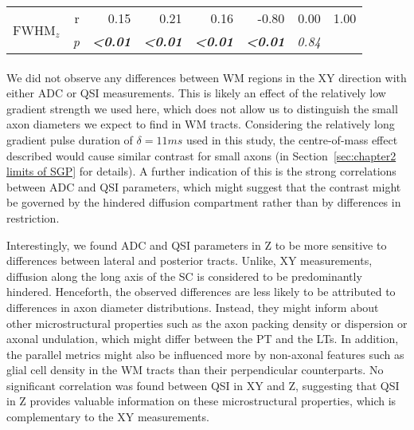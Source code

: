 \begin{table}[tb]
\begin{tableframe}
\begin{adjustbox}{width=0.9\textwidth,keepaspectratio}
\begin{minipage}{\textwidth}
\begin{tabular}{rrrrrrrr}
    \multicolumn{1}{c}{\multirow{2}[0]{*}{FWHM$_{z}$}} & r   & 0.15  & 0.21  & 0.16  & -0.80 & 0.00  & 1.00 \\
    \multicolumn{1}{c}{} & \textit{p} & \textbf{\textit{<0.01}} & \textbf{\textit{<0.01}} & \textbf{\textit{<0.01}} & \textbf{\textit{<0.01}} & \textit{0.84} & \textit{} \\
    \bottomrule
    \end{tabular}%
  	\end{minipage}
	\end{adjustbox}
\end{tableframe}
\end{table}


\paragraph{} We did not observe any differences between WM regions in the XY direction with either ADC or QSI measurements. This is likely an effect of the relatively low gradient strength we used here,  which does not allow us to distinguish the small axon diameters we expect to find in WM tracts. Considering the relatively long gradient pulse duration of $\delta=11ms$ used in this study, the centre-of-mass effect described would cause similar contrast for small axons (in Section~\ref{sec:chapter2 limits of SGP} for details). A further indication of this is the strong correlations between ADC and QSI parameters, which might suggest that the contrast might be governed by the hindered diffusion compartment rather than by differences in restriction.

Interestingly, we found ADC and QSI parameters in Z to be more sensitive to differences between lateral and posterior tracts. Unlike, XY measurements, diffusion along the long axis of the SC is considered to be predominantly hindered. Henceforth, the observed differences are less likely to be attributed to differences in axon diameter distributions. Instead, they might inform about other microstructural properties such as the axon packing density or dispersion\citep{Zhang:2012} or axonal undulation\citep{Nilsson:2012}, which might differ between the PT and the LTs. In addition, the parallel metrics might also be influenced more by non-axonal features such as glial cell density in the WM tracts than their perpendicular counterparts. No significant correlation was found between QSI in XY and Z, suggesting that QSI in Z provides valuable information on these microstructural properties, which is complementary to the XY measurements.

